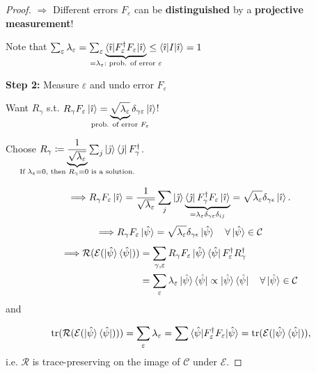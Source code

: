 \documentclass[a4paper, 12pt]{article}
\theoremstyle{plain}
\theoremstyle{definition}
\theoremstyle{remark}
\DeclareMathOperator{\tr}{tr}
\begin{document}
\begin{proof}
  $\Longrightarrow$ Different errors $F_\varepsilon$ can be \textbf{distinguished} by a \textbf{projective measurement}!

  Note that $\sum_\varepsilon \lambda_\varepsilon = \sum_\varepsilon\underbrace{ \braket{\hat{\imath}|F_\varepsilon^\dagger F_\varepsilon|\hat{\imath}}}_{\mathclap{=\lambda_\varepsilon:\text{ prob. of error }\varepsilon}}\leq\braket{\hat{\imath}|I|\hat{\imath}}=1$

  \textbf{Step 2:} Measure $\varepsilon$ and undo error $F_\varepsilon$

  Want $R_\gamma$ s.t. $R_\gamma F_\varepsilon \ket{\hat{\imath}}= \underbrace{\sqrt{\lambda_\varepsilon}}_{\mathclap{\text{prob. of error }F_\varepsilon}}\delta_{\gamma\varepsilon}\ket{\hat{\imath}}$!

  Choose $R_\gamma \coloneqq \underbrace{\frac{1}{\sqrt{\lambda_\varepsilon}}}_{\mathclap{\text{If } \lambda_\varepsilon=0,\text{ then }R_\gamma = 0\text{ is a solution.}}}\sum_j \ket{\hat{\jmath}}\bra{\hat{\jmath}}F_\gamma^\dagger$.

  \begin{equation*}
    \Longrightarrow R_\gamma F_\varepsilon \ket{\hat{\imath}}={\frac{1}{\sqrt{\lambda_\varepsilon}}}\sum_j \ket{\hat{\jmath}}\underbrace{\bra{\hat{\jmath}}F_\gamma^\dagger F_\varepsilon \ket{\hat{\imath}}}_{=\lambda_\varepsilon\delta_{\gamma\varepsilon}\delta_{ij}} = \sqrt{\lambda_\varepsilon}\delta_{\gamma\epsilon}\ket{\hat{\imath}}.
  \end{equation*}
  \begin{equation*}
    \Longrightarrow R_\gamma F_\varepsilon \ket{\hat{\psi}} = \sqrt{\lambda_\varepsilon}\delta_{\gamma\epsilon}\ket{\hat{\psi}} \quad \forall \ket{\hat{\psi}} \in \mathcal{C}
  \end{equation*}
  \begin{align*}
    \Longrightarrow\mathcal{R}(\mathcal{E}(\ket{\hat{\psi}}\bra{\hat{\psi}})) &= \sum_{\gamma,\varepsilon} R_\gamma F_\varepsilon \ket{\hat{\psi}}\bra{\hat{\psi}} F_\varepsilon^\dagger R_\gamma^\dagger \\
    &= \sum_\varepsilon \lambda_\varepsilon \ket{\hat{\psi}}\bra{\hat{\psi}} \propto \ket{\hat{\psi}}\bra{\hat{\psi}} \quad \forall \ket{\hat{\psi}} \in \mathcal{C}
  \end{align*}
  and

  \begin{equation*}
    \tr(\mathcal{R}(\mathcal{E}(\ket{\hat{\psi}}\bra{\hat{\psi}}))) = \sum_\varepsilon \lambda_\varepsilon = \sum \braket{\hat{\psi}|F_\varepsilon^\dagger F_\varepsilon |\hat{\psi}} = \tr(\mathcal{E}(\ket{\hat{\psi}}\bra{\hat{\psi}})),
  \end{equation*} i.e. $\mathcal{R}$ is trace-preserving on the image of $\mathcal{C}$ under $\mathcal{E}$.
\end{proof}
\end{document}
